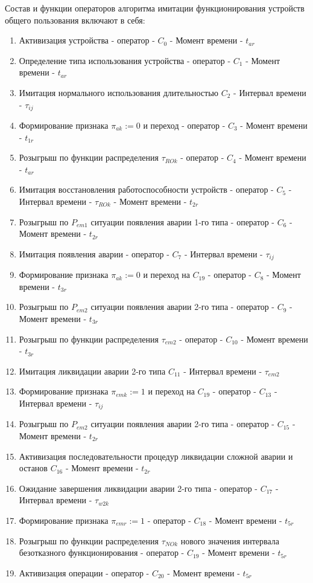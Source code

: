 Состав и функции операторов алгоритма имитации функционирования устройств общего пользования включают в себя:
\begin{enumerate}
    \item Активизация устройства - оператор - $C_0$ - Момент времени - $t_{ar}$
    \item Определение типа использования устройства - оператор - $C_1$ - Момент времени - $t_{ar}$
    \item Имитация нормального использования длительностью  $C_2$ - Интервал времени - $\tau_{ij}$
    \item Формирование признака $\pi_{ak}:=0$ и переход  - оператор - $C_3$ - Момент времени - $t_{1r}$
    \item Розыгрыш по функции распределения $\tau_{ROk}$ - оператор - $C_4$ - Момент времени - $t_{ar}$
    \item Имитация восстановления работоспособности устройств - оператор - $C_5$ - Интервал времени - $\tau_{ROk}$ - Момент времени - $t_{2r}$
    \item Розыгрыш по $P_{em1}$ ситуации появления аварии 1-го типа - оператор - $C_6$ - Момент времени - $t_{2r}$
    \item Имитация появления аварии  - оператор - $C_7$ - Интервал времени - $\tau_{ij}$
    \item Формирование признака $\pi_{ak}:=0$ и переход на $C_{19}$ - оператор - $C_8$ - Момент времени - $t_{3r}$
    \item Розыгрыш по $P_{em2}$ ситуации появления аварии 2-го типа - оператор - $C_{9}$ - Момент времени - $t_{3r}$
    \item Розыгрыш по функции распределения $\tau_{em2}$ - оператор - $C_{10}$  - Момент времени - $t_{3r}$
    \item Имитация ликвидации аварии 2-го типа $C_{11}$ - Интервал времени - $\tau_{em2}$
    \item Формирование признака $\pi_{emk}:=1$ и переход на $C_{19}$  - оператор - $C_{13}$  - Интервал времени - $\tau_{ij}$
    \item Розыгрыш по $P_{em2}$ ситуации появления аварии 2-го типа  - оператор -  $C_{15}$ - Момент времени - $t_{2r}$
    \item Активизация последовательности процедур ликвидации сложной аварии и останов $C_{16}$ - Момент времени - $t_{2r}$
    \item Ожидание завершения ликвидации аварии 2-го типа - оператор - $C_{17}$ - Интервал времени - $\tau_{w2k}$
    \item Формирование признака  $\pi_{emr}:=1$ - оператор - $C_{18}$  - Момент времени - $t_{5r}$
    \item Розыгрыш по функции распределения  $\tau_{NOk}$ нового значения интервала безотказного функционирования - оператор - $C_{19}$ - Момент времени - $t_{5r}$
    \item Активизация операции  - оператор - $C_{20}$ - Момент времени -  $t_{5r}$
\end{enumerate}



